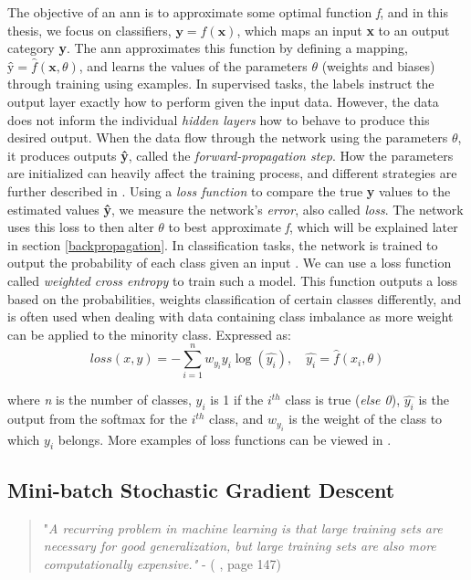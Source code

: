     The objective of an \gls{ann} is to approximate some optimal function \textit{f}, and in this thesis, we focus on classifiers, $\textbf{y} = f(\textbf{x})$, which maps an input \textbf{x} to an output category \textbf{y}. The \gls{ann} approximates this function by defining a mapping, $\textbf{\^{y}} = \hat{f}(\textbf{x},\theta)$, and learns the values of the parameters \textit{$\theta$} (weights and biases) through training using examples. In supervised tasks, the labels instruct the output layer exactly how to perform given the input data. However, the data does not inform the individual \textit{hidden layers} how to behave to produce this desired output. When the data flow through the network using the parameters $\theta$, it produces outputs \textbf{\^{y}}, called the \textit{forward-propagation step}. How the parameters are initialized can heavily affect the training process, and different strategies are further described in \citet{Goodfellow-et-al-2016}. Using a \textit{loss function} to compare the true \textbf{y} values to the estimated values \textbf{\^{y}}, we measure the network's \textit{error}, also called \textit{loss}. The network uses this loss to then alter $\theta$ to best approximate \textit{f}, which will be explained later in section \ref{backpropagation}. In classification tasks, the network is trained to output the probability of each class given an input \cite{ho2019real_weighted_cross_entropy}. We can use a loss function called \textit{weighted cross entropy} to train such a model. This function outputs a loss based on the probabilities, weights classification of certain classes differently, and is often used when dealing with data containing class imbalance as more weight can be applied to the minority class. Expressed as:
        \begin{equation} \label{cross_entropy}
            loss(x,y) = - \sum^{n}_{i=1} w_{y_{i}}y_{i}\log(\hat{y_{i}}), \quad \hat{y_{i}} = \hat{f}(x_i,\theta)
        \end{equation}
    
    where \textit{n} is the number of classes, $y_{i}$ is 1 if the $i^{th}$ class is true (\textit{else 0}), $\hat{y_{i}}$ is the output from the softmax for the $i^{th}$ class, and $w_{y_{i}}$ is the weight of the class to which $y_{i}$ belongs. More examples of loss functions can be viewed in \citeauthor{mishra2017deep} \cite{mishra2017deep}.
    


\subsection{Mini-batch Stochastic Gradient Descent} \label{batch learning}
        \begin{quote}
        "\textit{A recurring problem in machine learning is that large training sets are necessary for good generalization, but large training sets are also more computationally
        expensive."} - (\citet{Goodfellow-et-al-2016} \citeyear{Goodfellow-et-al-2016}, page 147)
    \end{quote}
    
